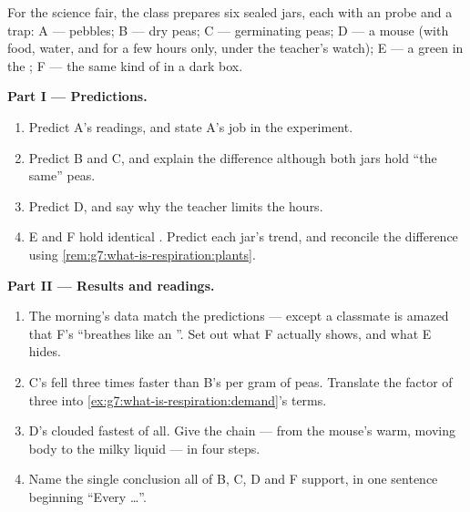 \begin{problem}\label{pb:g7:what-is-respiration:1}
For the science fair, the class prepares six sealed jars,
each with an  probe and a  trap: A ---
pebbles; B --- dry peas; C --- germinating peas; D --- a
mouse (with food, water, and for a few hours only, under
the teacher's watch); E --- a green  in the ; F
--- the same kind of  in a dark box.

\medskip\noindent\textbf{Part I --- Predictions.}
\begin{enumerate}
  \item Predict A's readings, and state A's job in the
        experiment.
  \item Predict B and C, and explain the difference
        although both jars hold ``the same'' peas.
  \item Predict D, and say why the teacher limits the
        hours.
  \item E and F hold identical . Predict each jar's
         trend, and reconcile the difference using
        \cref{rem:g7:what-is-respiration:plants}.
\end{enumerate}

\medskip\noindent\textbf{Part II --- Results and readings.}
\begin{enumerate}[resume]
  \item The morning's data match the predictions --- except
        a classmate is amazed that F's  ``breathes
        like an ''. Set out what F actually shows,
        and what E hides.
  \item C's  fell three times faster than B's per
        gram of peas. Translate the factor of three into
        \cref{ex:g7:what-is-respiration:demand}'s terms.
  \item D's  clouded fastest of all. Give the
        chain --- from the mouse's warm, moving body to the
        milky liquid --- in four steps.
  \item Name the single conclusion all of B, C, D and F
        support, in one sentence beginning ``Every \dots''.
\end{enumerate}


\end{problem}
